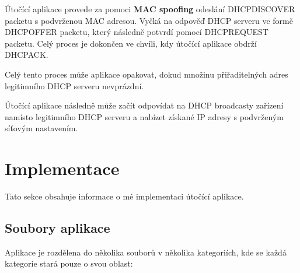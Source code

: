 \documentclass[a4paper,11pt]{article}
\begin{document}
Útočící aplikace provede za pomoci \textbf{MAC spoofing} odeslání \mbox{\textsf{DHCPDISCOVER}} packetu s podvrženou MAC adresou. Vyčká na odpověď DHCP serveru ve formě \mbox{\textsf{DHCPOFFER}} packetu, který následně potvrdí pomocí \mbox{\textsf{DHCPREQUEST}} packetu. Celý proces je dokončen ve chvíli, kdy útočící aplikace obdrží \mbox{\textsf{DHCPACK}}.

\vspace{2mm}
Celý tento proces může aplikace opakovat, dokud množinu přiřaditelných adres legitimního DHCP serveru nevprázdní.

\vspace{2mm}
Útočící aplikace následně může začít odpovídat na DHCP broadcasty zařízení namísto legitimního DHCP serveru a nabízet získané IP adresy s podvrženým síťovým nastavením.



\newpage
\section{Implementace} \label{implementace}

Tato sekce obsahuje informace o mé implementaci útočící aplikace.

\subsection{Soubory aplikace}

Aplikace je rozdělena do několika souborů v několika kategoriích, kde se každá kategorie stará pouze o svou oblast:
\end{document}
